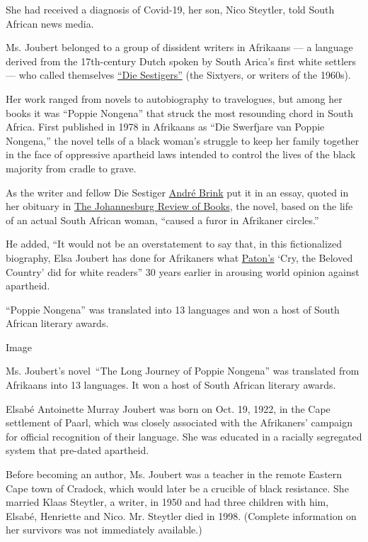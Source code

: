 She had received a diagnosis of Covid-19, her son, Nico Steytler, told
South African news media.

Ms. Joubert belonged to a group of dissident writers in Afrikaans --- a
language derived from the 17th-century Dutch spoken by South Arica's
first white settlers --- who called themselves
\href{https://www.britannica.com/topic/Sestigers}{``Die Sestigers''}
(the Sixtyers, or writers of the 1960s).

Her work ranged from novels to autobiography to travelogues, but among
her books it was ``Poppie Nongena'' that struck the most resounding
chord in South Africa. First published in 1978 in Afrikaans as ``Die
Swerfjare van Poppie Nongena,'' the novel tells of a black woman's
struggle to keep her family together in the face of oppressive apartheid
laws intended to control the lives of the black majority from cradle to
grave.

As the writer and fellow Die Sestiger
\href{https://www.britannica.com/biography/Andre-Philippus-Brink\#ref113215}{André
Brink} put it in an essay, quoted in her obituary in
\href{https://johannesburgreviewofbooks.com/2020/06/15/elsa-joubert-1922-2020-rip/}{The
Johannesburg Review of Books}, the novel, based on the life of an actual
South African woman, ``caused a furor in Afrikaner circles.''

He added, ``It would not be an overstatement to say that, in this
fictionalized biography, Elsa Joubert has done for Afrikaners what
\href{https://www.nytimes3xbfgragh.onion/1988/04/13/obituaries/alan-paton-author-who-fought-against-apartheid-is-dead-at-85.html}{Paton's}
`Cry, the Beloved Country' did for white readers'' 30 years earlier in
arousing world opinion against apartheid.

``Poppie Nongena'' was translated into 13 languages and won a host of
South African literary awards.

Image

Ms. Joubert's novel~``The Long Journey of Poppie Nongena'' was
translated from Afrikaans into 13 languages. It won a host of South
African literary awards.

Elsabé Antoinette Murray Joubert was born on Oct. 19, 1922, in the Cape
settlement of Paarl, which was closely associated with the Afrikaners'
campaign for official recognition of their language. She was educated in
a racially segregated system that pre-dated apartheid.

Before becoming an author, Ms. Joubert was a teacher in the remote
Eastern Cape town of Cradock, which would later be a crucible of black
resistance. She married Klaas Steytler, a writer, in 1950 and had three
children with him, Elsabé, Henriette and Nico. Mr. Steytler died in
1998. (Complete information on her survivors was not immediately
available.)

